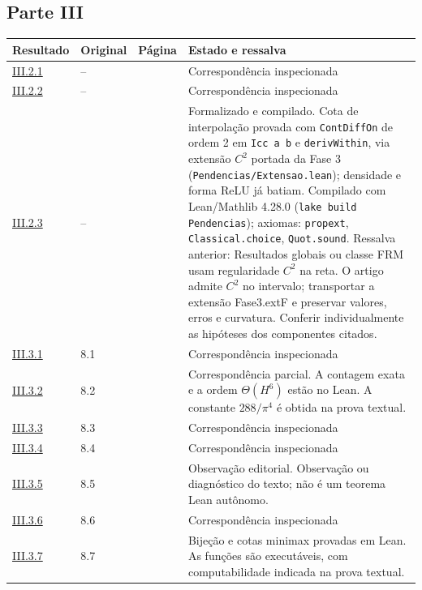 \subsection*{Parte III}
\small
\begin{longtable}{@{}p{.11\linewidth}p{.09\linewidth}p{.09\linewidth}p{.59\linewidth}@{}}
\toprule Resultado & Original & Página & Estado e ressalva\\\midrule\endhead
\hyperref[map:artigo_2:2.1]{III.2.1} & -- & \pageref{map:artigo_2:2.1} & Correspondência inspecionada\\[4pt]
\hyperref[map:artigo_2:2.2]{III.2.2} & -- & \pageref{map:artigo_2:2.2} & Correspondência inspecionada\\[4pt]
\hyperref[map:artigo_2:2.3]{III.2.3} & -- & \pageref{map:artigo_2:2.3} & Formalizado e compilado. Cota de interpolação provada com \texttt{ContDiffOn} de ordem 2 em \texttt{Icc a b} e \texttt{derivWithin}, via extensão $C^2$ portada da Fase 3 (\texttt{Pendencias/Extensao.lean}); densidade e forma ReLU já batiam. Compilado com Lean/Mathlib 4.28.0 (\texttt{lake build Pendencias}); axiomas: \texttt{propext}, \texttt{Classical.choice}, \texttt{Quot.sound}. Ressalva anterior: Resultados globais ou classe FRM usam regularidade $C^2$ na reta. O artigo admite $C^2$ no intervalo; transportar a extensão Fase3.extF e preservar valores, erros e curvatura. Conferir individualmente as hipóteses dos componentes citados.\\[4pt]
\hyperref[map:artigo_2:3.1]{III.3.1} & 8.1 & \pageref{map:artigo_2:3.1} & Correspondência inspecionada\\[4pt]
\hyperref[map:artigo_2:3.2]{III.3.2} & 8.2 & \pageref{map:artigo_2:3.2} & Correspondência parcial. A contagem exata e a ordem $\Theta(H^6)$ estão no Lean. A constante $288/\pi^4$ é obtida na prova textual.\\[4pt]
\hyperref[map:artigo_2:3.3]{III.3.3} & 8.3 & \pageref{map:artigo_2:3.3} & Correspondência inspecionada\\[4pt]
\hyperref[map:artigo_2:3.4]{III.3.4} & 8.4 & \pageref{map:artigo_2:3.4} & Correspondência inspecionada\\[4pt]
\hyperref[map:artigo_2:3.5]{III.3.5} & 8.5 & \pageref{map:artigo_2:3.5} & Observação editorial. Observação ou diagnóstico do texto; não é um teorema Lean autônomo.\\[4pt]
\hyperref[map:artigo_2:3.6]{III.3.6} & 8.6 & \pageref{map:artigo_2:3.6} & Correspondência inspecionada\\[4pt]
\hyperref[map:artigo_2:3.7]{III.3.7} & 8.7 & \pageref{map:artigo_2:3.7} & Bijeção e cotas minimax provadas em Lean. As funções são executáveis, com computabilidade indicada na prova textual.\\[4pt]

\end{longtable}
